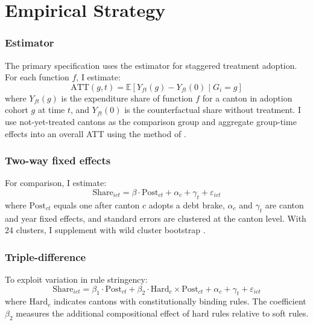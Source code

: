 \documentclass[12pt]{article}
\newcommand{\E}{\mathbb{E}}
\begin{document}



\section{Empirical Strategy}\label{sec:method}

\subsubsection*{Estimator} The primary specification uses the \citet{callaway2021difference} estimator for staggered treatment adoption. For each function $f$, I estimate:
\begin{equation}
    \text{ATT}(g,t) = \E[Y_{ft}(g) - Y_{ft}(0) \mid G_i = g]
\end{equation}
where $Y_{ft}(g)$ is the expenditure share of function $f$ for a canton in adoption cohort $g$ at time $t$, and $Y_{ft}(0)$ is the counterfactual share without treatment. I use not-yet-treated cantons as the comparison group and aggregate group-time effects into an overall ATT using the method of \citet{callaway2021difference}.

\subsubsection*{Two-way fixed effects} For comparison, I estimate:
\begin{equation}
    \text{Share}_{ict} = \beta \cdot \text{Post}_{ct} + \alpha_c + \gamma_t + \varepsilon_{ict}
\end{equation}
where $\text{Post}_{ct}$ equals one after canton $c$ adopts a debt brake, $\alpha_c$ and $\gamma_t$ are canton and year fixed effects, and standard errors are clustered at the canton level. With 24 clusters, I supplement with wild cluster bootstrap \citep{cameron2008bootstrap}.

\subsubsection*{Triple-difference} To exploit variation in rule stringency:
\begin{equation}
    \text{Share}_{ict} = \beta_1 \cdot \text{Post}_{ct} + \beta_2 \cdot \text{Hard}_c \times \text{Post}_{ct} + \alpha_c + \gamma_t + \varepsilon_{ict}
\end{equation}
where $\text{Hard}_c$ indicates cantons with constitutionally binding rules. The coefficient $\beta_2$ measures the additional compositional effect of hard rules relative to soft rules.
\end{document}
